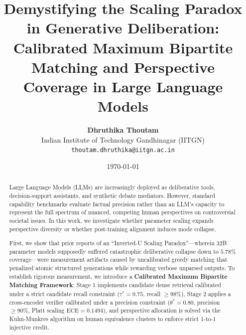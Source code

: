\documentclass[11pt,a4paper]{article}
\title{\textbf{Demystifying the Scaling Paradox in Generative Deliberation: \\
Calibrated Maximum Bipartite Matching and Perspective Coverage in Large Language Models}}
\author{
  \textbf{Dhruthika Thoutam} \\
  Indian Institute of Technology Gandhinagar (IITGN) \\
  \texttt{thoutam.dhruthika@iitgn.ac.in}
}
\date{\today}
\begin{document}
\maketitle

\begin{abstract}
Large Language Models (LLMs) are increasingly deployed as deliberative tools, decision-support assistants, and synthetic debate mediators. However, standard capability benchmarks evaluate factual precision rather than an LLM's capacity to represent the full spectrum of nuanced, competing human perspectives on controversial societal issues. In this work, we investigate whether parameter scaling expands perspective diversity or whether post-training alignment induces mode collapse.

First, we show that prior reports of an ``Inverted-U Scaling Paradox''---wherein 32B parameter models supposedly suffered catastrophic deliberative collapse down to $5.78\%$ coverage---were measurement artifacts caused by uncalibrated greedy matching that penalized atomic structured generations while rewarding verbose unparsed outputs. To establish rigorous measurement, we introduce a \textbf{Calibrated Maximum Bipartite Matching Framework}: Stage 1 implements candidate dense retrieval calibrated under a strict candidate recall constraint ($\tau^* = 0.75$, recall $\ge 98\%$), Stage 2 applies a cross-encoder verifier calibrated under a precision constraint ($\theta^* = 0.80$, precision $\ge 90\%$, Platt scaling $\text{ECE} = 0.1494$), and perspective allocation is solved via the Kuhn-Munkres algorithm on human equivalence clusters to enforce strict 1-to-1 injective credit.


\end{abstract}
\end{document}
